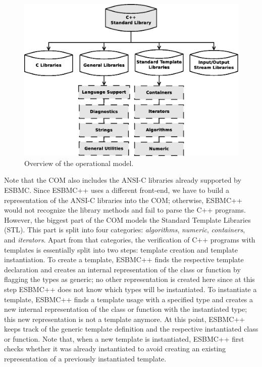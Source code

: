 \documentclass[conference]{IEEEtran}
\begin{document}
\begin{figure}[ht]
\centering
\includegraphics[scale=0.25]{figures/diagramascpp}
\caption{Overview of the operational model.}
\label{figure:cpp-diagram}
\end{figure}


Note that the COM also includes the ANSI-C libraries already
supported by ESBMC.  Since ESBMC++ uses a different front-end, we have to build
a representation of the ANSI-C libraries into the COM; otherwise, ESBMC++ would
not recognize the library methods and fail to parse the C++ programs.
%
However, the biggest part of the COM models
the Standard Template Libraries (STL).
This part is split into
four categories: \textit{algorithms}, \textit{numeric},
\textit{containers}, and \textit{iterators}.
Apart from that categories, the verification of C++ programs with
templates is essentially split into two steps: template creation
and template instantiation. To create a template, ESBMC++ finds
the respective template declaration and creates an internal representation
of the class or function by flagging the types as generic; no other representation
is created here since at this step ESBMC++ does not know which types will be
instantiated. To instantiate a template, ESBMC++ finds a template usage
with a specified type and creates a new internal representation of the
class or function with the instantiated type; this new representation
is not a template anymore. At this point, ESBMC++ keeps track of the
generic template definition and the respective instantiated class or function.
Note that, when a new template is instantiated, ESBMC++ first checks whether it was already
instantiated to avoid creating an existing representation of a previously
instantiated template.
\end{document}
